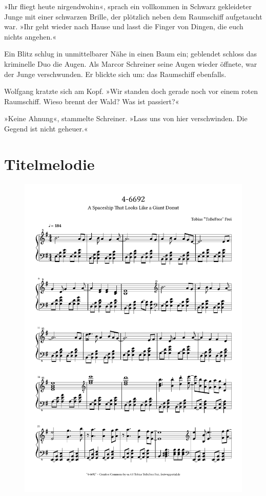 »Ihr fliegt heute nirgendwohin«, sprach ein vollkommen in Schwarz gekleideter Junge mit einer schwarzen Brille, der plötzlich neben dem Raumschiff aufgetaucht war. »Ihr geht wieder nach Hause und lasst die Finger von Dingen, die euch nichts angehen.«

Ein Blitz schlug in unmittelbarer Nähe in einen Baum ein; geblendet schloss das kriminelle Duo die Augen. Als Marcor Schreiner seine Augen wieder öffnete, war der Junge verschwunden. Er blickte sich um: das Raumschiff ebenfalls.

Wolfgang kratzte sich am Kopf. »Wir standen doch gerade noch vor einem roten Raumschiff. Wieso brennt der Wald? Was ist passiert?«

»Keine Ahnung«, stammelte Schreiner. »Lass uns von hier verschwinden. Die Gegend ist nicht geheuer.«


\chapter{Titelmelodie}

\begin{figure}[p]
    \includegraphics[width=\textwidth, page=1]{z-include-ia2theme.pdf}
\end{figure}

